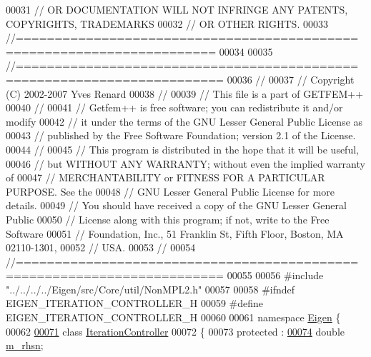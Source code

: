 \begin{DoxyCode}
00031 \textcolor{comment}{// OR DOCUMENTATION WILL NOT INFRINGE ANY PATENTS, COPYRIGHTS, TRADEMARKS}
00032 \textcolor{comment}{// OR OTHER RIGHTS.}
00033 \textcolor{comment}{//=======================================================================}
00034 
00035 \textcolor{comment}{//========================================================================}
00036 \textcolor{comment}{//}
00037 \textcolor{comment}{// Copyright (C) 2002-2007 Yves Renard}
00038 \textcolor{comment}{//}
00039 \textcolor{comment}{// This file is a part of GETFEM++}
00040 \textcolor{comment}{//}
00041 \textcolor{comment}{// Getfem++ is free software; you can redistribute it and/or modify}
00042 \textcolor{comment}{// it under the terms of the GNU Lesser General Public License as}
00043 \textcolor{comment}{// published by the Free Software Foundation; version 2.1 of the License.}
00044 \textcolor{comment}{//}
00045 \textcolor{comment}{// This program is distributed in the hope that it will be useful,}
00046 \textcolor{comment}{// but WITHOUT ANY WARRANTY; without even the implied warranty of}
00047 \textcolor{comment}{// MERCHANTABILITY or FITNESS FOR A PARTICULAR PURPOSE.  See the}
00048 \textcolor{comment}{// GNU Lesser General Public License for more details.}
00049 \textcolor{comment}{// You should have received a copy of the GNU Lesser General Public}
00050 \textcolor{comment}{// License along with this program; if not, write to the Free Software}
00051 \textcolor{comment}{// Foundation, Inc., 51 Franklin St, Fifth Floor, Boston, MA  02110-1301,}
00052 \textcolor{comment}{// USA.}
00053 \textcolor{comment}{//}
00054 \textcolor{comment}{//========================================================================}
00055 
00056 \textcolor{preprocessor}{#include "../../../../Eigen/src/Core/util/NonMPL2.h"}
00057 
00058 \textcolor{preprocessor}{#ifndef EIGEN\_ITERATION\_CONTROLLER\_H}
00059 \textcolor{preprocessor}{#define EIGEN\_ITERATION\_CONTROLLER\_H}
00060 
00061 \textcolor{keyword}{namespace }\hyperlink{namespace_eigen}{Eigen} \{ 
00062 
\hyperlink{class_eigen_1_1_iteration_controller}{00071} \textcolor{keyword}{class }\hyperlink{class_eigen_1_1_iteration_controller}{IterationController}
00072 \{
00073   protected :
\hyperlink{class_eigen_1_1_iteration_controller_a43364d62c43861aff44cb0a86c4615a6}{00074}     \textcolor{keywordtype}{double} \hyperlink{class_eigen_1_1_iteration_controller_a43364d62c43861aff44cb0a86c4615a6}{m\_rhsn};        

\end{DoxyCode}
